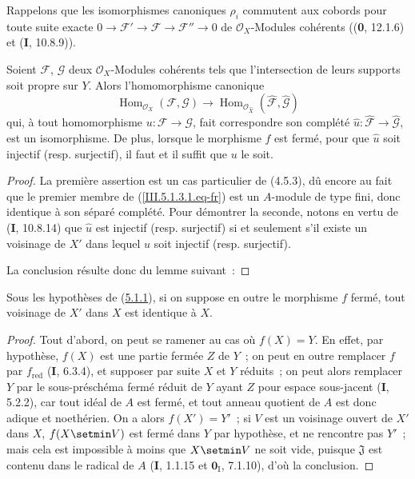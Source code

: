 Rappelons que les isomorphismes canoniques $\rho_i$ commutent aux cobords pour
toute suite exacte
$0\to\mathcal F'\to\mathcal F\to\mathcal F''\to0$ de $\mathcal O_X$-Modules
cohérents ((\textbf{0}, 12.1.6) et (\textbf{I}, 10.8.9)).

\begin{corollary}[5.1.3]
\label{III.5.1.3-fr}
Soient $\mathcal F$, $\mathcal G$ deux $\mathcal O_X$-Modules cohérents tels que
l'intersection de leurs supports soit propre sur $Y$. Alors l'homomorphisme canonique
\begin{equation}
\operatorname{Hom}_{\mathcal O_X}(\mathcal F,\mathcal G)
\longrightarrow
\operatorname{Hom}_{\mathcal O_{\widehat X}}
(\widehat{\mathcal F},\widehat{\mathcal G})
\tag{5.1.3.1}
\label{III.5.1.3.1.eq-fr}
\end{equation}
qui, à tout homomorphisme $u:\mathcal F\to\mathcal G$, fait correspondre son
complété $\widehat u:\widehat{\mathcal F}\to\widehat{\mathcal G}$, est un
isomorphisme. De plus, lorsque le morphisme $f$ est fermé, pour que $\widehat u$ soit
injectif (\textup{resp.} surjectif), il faut et il suffit que $u$ le soit.
\end{corollary}

\begin{proof}
La première assertion est un cas particulier de (4.5.3), dû encore au fait que le
premier membre de (\ref{III.5.1.3.1.eq-fr}) est un $A$-module de type fini, donc
identique à son séparé complété. Pour démontrer la seconde, notons en vertu de
(\textbf{I}, 10.8.14) que $\widehat u$ est injectif (resp. surjectif) si et seulement s'il existe
un voisinage de $X'$ dans lequel $u$ soit injectif (resp. surjectif).

La conclusion
résulte donc du lemme suivant~:
\end{proof}

\begin{lemma}[5.1.3.1]
\label{III.5.1.3.1-fr}
Sous les hypothèses de \textup{(\hyperref[III.5.1.1-fr]{5.1.1})}, si on suppose en outre le
morphisme $f$ fermé, tout voisinage de $X'$ dans $X$ est identique à $X$.
\end{lemma}

\begin{proof}
Tout d'abord, on peut se ramener au cas où $f(X)=Y$. En effet, par hypothèse,
$f(X)$ est une partie fermée $Z$ de $Y$~; on peut en outre remplacer $f$ par
$f_{\mathrm{red}}$ (\textbf{I}, 6.3.4), et supposer par suite $X$ et $Y$ réduits~; on peut alors
remplacer $Y$ par le sous-préschéma fermé réduit de $Y$ ayant $Z$ pour espace
sous-jacent (\textbf{I}, 5.2.2), car tout idéal de $A$ est fermé, et tout anneau quotient de
$A$ est donc adique et noethérien. On a alors $f(X')=Y'$~; si $V$ est un voisinage
ouvert de $X'$ dans $X$, $f(X\setmin V)$ est fermé dans $Y$ par hypothèse, et ne rencontre
pas $Y'$~; mais cela est impossible à moins que $X\setmin V$ ne soit vide, puisque
$\mathfrak J$ est contenu dans le radical de $A$ (\textbf{I}, 1.1.15 et $\mathbf{0}_{\mathrm I}$,
7.1.10), d'où la conclusion.
\end{proof}

